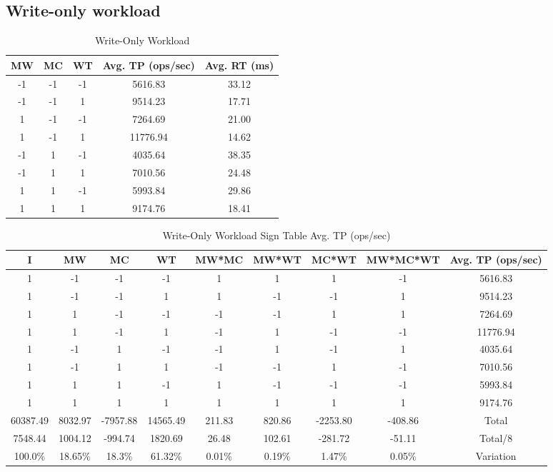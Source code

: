 \documentclass[11pt,a4paper]{article}
\begin{document}
\subsection{Write-only workload}
%
\begin{table}[H]
\centering
\scriptsize{
\begin{tabular}{|c|c|c|c|c|}
\hline MW & MC & WT & Avg. TP (ops/sec) & Avg. RT (ms)\\
\hline
-1 & -1 & -1 & 5616.83 & 33.12\\
\hline
-1 & -1 & 1 & 9514.23 & 17.71\\
\hline
1 & -1 & -1 & 7264.69 & 21.00\\
\hline
1 & -1 & 1 & 11776.94 & 14.62\\
\hline
-1 & 1 & -1 & 4035.64 & 38.35\\
\hline
-1 & 1 & 1 & 7010.56 & 24.48\\
\hline
1 & 1 & -1 & 5993.84 & 29.86\\
\hline
1 & 1 & 1 & 9174.76 & 18.41\\
\hline
\end{tabular}
}
\caption{Write-Only Workload}
\end{table}
%
\begin{table}[H]
\centering
\scriptsize{
\begin{tabular}{|c|ccccccc|c|}
\hline I & MW & MC & WT & MW*MC & MW*WT & MC*WT & MW*MC*WT & Avg. TP (ops/sec)\\
\hline
1 & -1 & -1 & -1 & 1 & 1 & 1 & -1 & 5616.83\\
1 & -1 & -1 & 1 & 1 & -1 & -1 & 1 & 9514.23\\
1 & 1 & -1 & -1 & -1 & -1 & 1 & 1 & 7264.69\\
1 & 1 & -1 & 1 & -1 & 1 & -1 & -1 & 11776.94\\
1 & -1 & 1 & -1 & -1 & 1 & -1 & 1 & 4035.64\\
1 & -1 & 1 & 1 & -1 & -1 & 1 & -1 & 7010.56\\
1 & 1 & 1 & -1 & 1 & -1 & -1 & -1 & 5993.84\\
1 & 1 & 1 & 1 & 1 & 1 & 1 & 1 & 9174.76\\
\hline
60387.49 & 8032.97 & -7957.88 & 14565.49 & 211.83 & 820.86 & -2253.80 & -408.86 & Total\\
7548.44 & 1004.12 & -994.74 & 1820.69 & 26.48 & 102.61 & -281.72 & -51.11 & Total/8\\
100.0\% & 18.65\% & 18.3\% & 61.32\% & 0.01\% & 0.19\% & 1.47\% & 0.05\% & Variation\\
\hline
\end{tabular}
}
\caption{Write-Only Workload Sign Table Avg. TP (ops/sec)}
\label{2k_set_tp}
\end{table}
\end{document}
